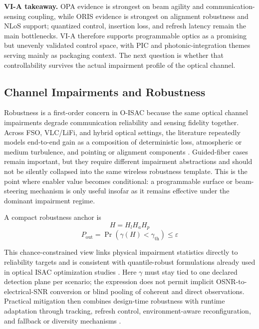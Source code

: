 \documentclass[letterpaper,journal]{IEEEtran}
\begin{document}
\textbf{VI-A takeaway.} OPA evidence is strongest on beam agility and communication-sensing coupling, while ORIS evidence is strongest on alignment robustness and NLoS support; quantized control, insertion loss, and refresh latency remain the main bottlenecks. VI-A therefore supports programmable optics as a promising but unevenly validated control space, with PIC and photonic-integration themes serving mainly as packaging context. The next question is whether that controllability survives the actual impairment profile of the optical channel.

\subsection{Channel Impairments and Robustness}

Robustness is a first-order concern in O-ISAC because the same optical channel impairments degrade communication reliability and sensing fidelity together. Across FSO, VLC/LiFi, and hybrid optical settings, the literature repeatedly models end-to-end gain as a composition of deterministic loss, atmospheric or medium turbulence, and pointing or alignment components \cite{O_ISAC_023,O_ISAC_035,O_ISAC_061,O_ISAC_098,O_ISAC_199}. Guided-fiber cases remain important, but they require different impairment abstractions and should not be silently collapsed into the same wireless robustness template. This is the point where enabler value becomes conditional: a programmable surface or beam-steering mechanism is only useful insofar as it remains effective under the dominant impairment regime.

A compact robustness anchor is
\begin{equation}
    H=H_l H_a H_p
\end{equation}
\begin{equation}
    P_{\text{out}}=\Pr\!\left(\gamma(H)<\gamma_{\text{th}}\right)\le \varepsilon
\end{equation}

This chance-constrained view links physical impairment statistics directly to reliability targets and is consistent with quantile-robust formulations already used in optical ISAC optimization studies \cite{O_ISAC_023,O_ISAC_061,O_ISAC_091}. Here $\gamma$ must stay tied to one declared detection plane per scenario; the expression does not permit implicit OSNR-to-electrical-SNR conversion or blind pooling of coherent and direct observations. Practical mitigation then combines design-time robustness with runtime adaptation through tracking, refresh control, environment-aware reconfiguration, and fallback or diversity mechanisms \cite{O_ISAC_098,O_ISAC_112,O_ISAC_127,O_ISAC_199}.
\end{document}
